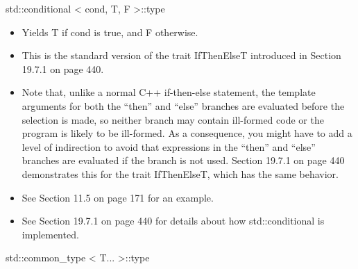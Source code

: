 std::conditional < cond, T, F >::type

\begin{itemize}
\item
Yields T if cond is true, and F otherwise.

\item
This is the standard version of the trait IfThenElseT introduced in Section 19.7.1 on page 440.

\item
Note that, unlike a normal C++ if-then-else statement, the template arguments for both the “then” and “else” branches are evaluated before the selection is made, so neither branch may contain ill-formed code or the program is likely to be ill-formed. As a consequence, you might have to add a level of indirection to avoid that expressions in the “then” and “else” branches are evaluated if the branch is not used. Section 19.7.1 on page 440 demonstrates this for the trait IfThenElseT, which has the same behavior.

\item
See Section 11.5 on page 171 for an example.

\item
See Section 19.7.1 on page 440 for details about how std::conditional is implemented.
\end{itemize}

std::common\_type < T... >::type

